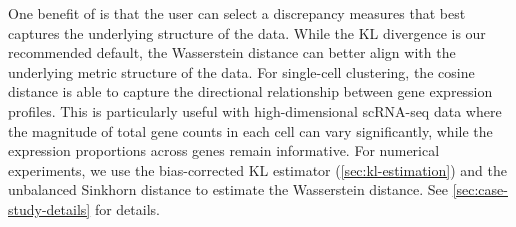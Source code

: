One benefit of \methodname is that the user can select a discrepancy measures
that best captures the underlying structure of the data.
While the KL divergence is our recommended default,
the Wasserstein distance can better align with the underlying metric structure of the data.
For single-cell clustering, the cosine distance is able to capture the directional relationship between gene expression profiles.
This is particularly useful with high-dimensional scRNA-seq data where the magnitude of total gene counts in each cell can vary
significantly, while the expression proportions across genes remain informative. %
%
For numerical experiments, we use the bias-corrected KL estimator (\cref{sec:kl-estimation}) and the unbalanced Sinkhorn distance to estimate the Wasserstein distance.
See \cref{sec:case-study-details} for details.
%
%

